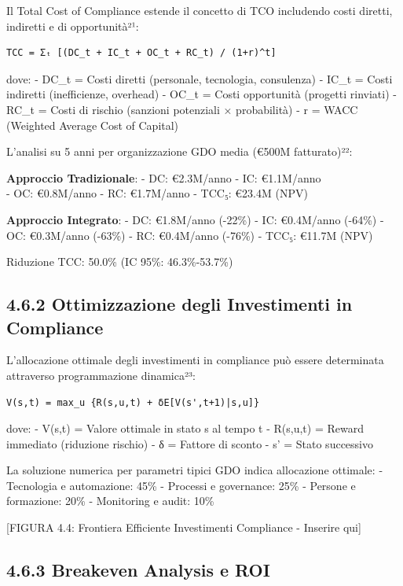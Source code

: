 \documentclass[12pt,a4paper,oneside]{book}
\numberwithin{figure}{chapter} %
\numberwithin{table}{chapter}  %
\begin{document}
Il Total Cost of Compliance estende il concetto di TCO includendo costi
diretti, indiretti e di opportunità²¹:

\begin{verbatim}
TCC = Σₜ [(DC_t + IC_t + OC_t + RC_t) / (1+r)^t]
\end{verbatim}

dove: - DC\_t = Costi diretti (personale, tecnologia, consulenza) -
IC\_t = Costi indiretti (inefficienze, overhead) - OC\_t = Costi
opportunità (progetti rinviati) - RC\_t = Costi di rischio (sanzioni
potenziali × probabilità) - r = WACC (Weighted Average Cost of Capital)

L'analisi su 5 anni per organizzazione GDO media (€500M fatturato)²²:

\textbf{Approccio Tradizionale}: - DC: €2.3M/anno - IC: €1.1M/anno\\
- OC: €0.8M/anno - RC: €1.7M/anno - TCC₅: €23.4M (NPV)

\textbf{Approccio Integrato}: - DC: €1.8M/anno (-22\%) - IC: €0.4M/anno
(-64\%) - OC: €0.3M/anno (-63\%) - RC: €0.4M/anno (-76\%) - TCC₅: €11.7M
(NPV)

Riduzione TCC: 50.0\% (IC 95\%: 46.3\%-53.7\%)

\subsection{4.6.2 Ottimizzazione degli Investimenti in
Compliance}\label{ottimizzazione-degli-investimenti-in-compliance}

L'allocazione ottimale degli investimenti in compliance può essere
determinata attraverso programmazione dinamica²³:

\begin{verbatim}
V(s,t) = max_u {R(s,u,t) + δE[V(s',t+1)|s,u]}
\end{verbatim}

dove: - V(s,t) = Valore ottimale in stato s al tempo t - R(s,u,t) =
Reward immediato (riduzione rischio) - δ = Fattore di sconto - s' =
Stato successivo

La soluzione numerica per parametri tipici GDO indica allocazione
ottimale: - Tecnologia e automazione: 45\% - Processi e governance: 25\%
- Persone e formazione: 20\% - Monitoring e audit: 10\%

{[}FIGURA 4.4: Frontiera Efficiente Investimenti Compliance - Inserire
qui{]}

\subsection{4.6.3 Breakeven Analysis e
ROI}\label{breakeven-analysis-e-roi}
\end{document}
